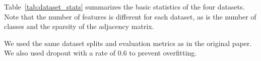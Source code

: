 Table~\ref{tab:dataset_stats} summarizes the basic statistics of the four datasets.
Note that the number of features is different for each dataset, as is the number of classes and the sparsity of the adjacency matrix.


We used the same dataset splits and evaluation metrics as in the original paper.
We also used dropout with a rate of 0.6 to prevent overfitting.
